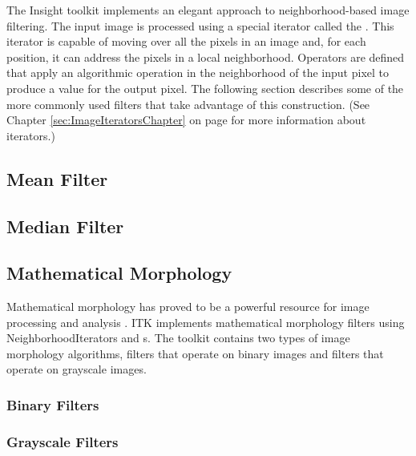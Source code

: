 The Insight toolkit implements an elegant approach to neighborhood-based image
filtering.  The input image is processed using a special iterator called the
. This iterator is capable of moving over all the
pixels in an image and, for each position, it can address the pixels in a local
neighborhood. Operators are defined that apply an algorithmic operation in the
neighborhood of the input pixel to produce a value for the output pixel.  The
following section describes some of the more commonly used filters that take
advantage of this construction. (See Chapter
\ref{sec:ImageIteratorsChapter} on page
\pageref{sec:ImageIteratorsChapter} for more information about iterators.)

\subsection{Mean Filter}
\label{sec:MeanFilter}

\ifitkFullVersion

\fi

\subsection{Median Filter}
\label{sec:MedianFilter}

\ifitkFullVersion

\fi


\subsection{Mathematical Morphology}
\label{sec:MathematicalMorphology}

Mathematical morphology has proved to be a powerful resource for image
processing and analysis \cite{Serra1982}. ITK implements mathematical
morphology filters using NeighborhoodIterators and
s.  The toolkit contains two types of image
morphology algorithms, filters that operate on binary images and filters that
operate on grayscale images.

\subsubsection{Binary Filters}
\label{sec:MathematicalMorphologyBinaryFilters}

\ifitkFullVersion

\fi


\subsubsection{Grayscale Filters}
\label{sec:MathematicalMorphologyGrayscaleFilters}

